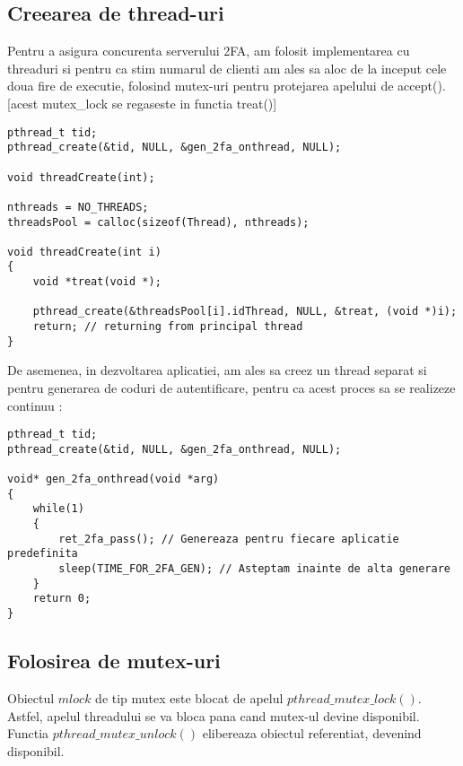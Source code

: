 \documentclass{article}
\begin{document}
	\subsection{Creearea de thread-uri}
	Pentru a asigura concurenta serverului 2FA, am folosit implementarea cu threaduri si pentru ca stim numarul de clienti am ales sa aloc de la inceput cele doua fire de executie, folosind mutex-uri pentru protejarea apelului de accept(). [acest mutex\_lock se regaseste in functia treat()]
	
	\begin{tcolorbox}[colback=green!5,colframe=green!40!black,width = \linewidth, title = Initializare thread-uri (prethreaded server)]
		\begin{Verbatim}[tabsize=4]
pthread_t tid;
pthread_create(&tid, NULL, &gen_2fa_onthread, NULL); 
		
void threadCreate(int);
		
nthreads = NO_THREADS;
threadsPool = calloc(sizeof(Thread), nthreads);
			
void threadCreate(int i)
{
	void *treat(void *);

	pthread_create(&threadsPool[i].idThread, NULL, &treat, (void *)i);
	return; // returning from principal thread
}
		\end{Verbatim}
	\end{tcolorbox} 
	\noindent
	De asemenea, in dezvoltarea aplicatiei, am ales sa creez un thread separat si pentru generarea de coduri de autentificare, pentru ca acest proces sa se realizeze continuu :
	
\begin{tcolorbox}[colback=green!5,colframe=green!40!black,width = \linewidth, title = Initializare thread pentru generarea 2FA]
	\begin{Verbatim}[tabsize=4]
pthread_t tid;
pthread_create(&tid, NULL, &gen_2fa_onthread, NULL); 

void* gen_2fa_onthread(void *arg)
{
	while(1)
	{
		ret_2fa_pass(); // Genereaza pentru fiecare aplicatie predefinita
		sleep(TIME_FOR_2FA_GEN); // Asteptam inainte de alta generare
	}
	return 0;
}
	\end{Verbatim}
\end{tcolorbox} 
	
	\subsection{Folosirea de mutex-uri}
	Obiectul $mlock$ de tip mutex este blocat de apelul $pthread\_mutex\_lock()$. Astfel, apelul threadului se va bloca pana cand mutex-ul devine disponibil.\\
	Functia $pthread\_mutex\_unlock()$ elibereaza obiectul referentiat, devenind disponibil.
	
\end{document}
